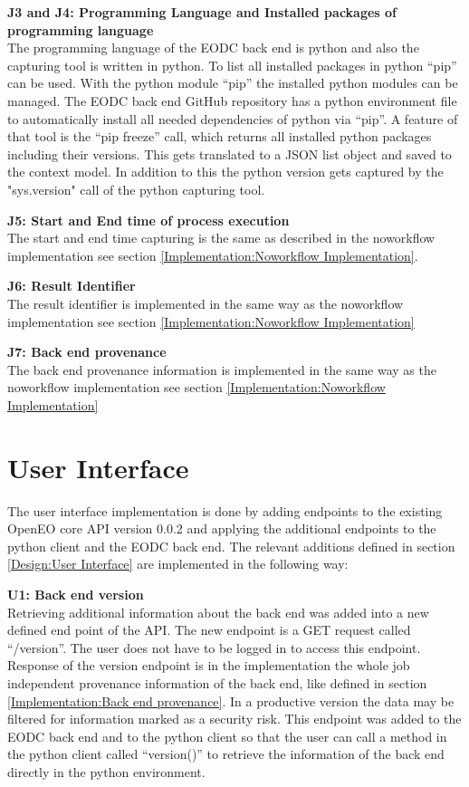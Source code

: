 \documentclass[draft,final]{vutinfth} %
\begin{document}
\textbf{J3 and J4: Programming Language and  Installed packages of programming language} \\
The programming language of the EODC back end is python and also the capturing tool is written in python. To list all installed packages in python “pip” can be used. With the python module “pip” the installed python modules can be managed. The EODC back end GitHub repository has a python environment file to automatically install all needed dependencies of python via “pip”. A feature of that tool is the “pip freeze” call, which returns all installed python packages including their versions. This gets translated to a JSON list object and saved to the context model. In addition to this the python version gets captured by the "sys.version" call of the python capturing tool.    

\textbf{J5: Start and End time of process execution} \\
The start and end time capturing is the same as described in the noworkflow implementation see section \ref{Implementation:Noworkflow Implementation}.

\textbf{J6: Result Identifier } \\
The result identifier is implemented in the same way as the noworkflow implementation see section \ref{Implementation:Noworkflow Implementation}

\textbf{J7: Back end provenance} \\
The back end provenance information is implemented in the same way as the noworkflow implementation see section \ref{Implementation:Noworkflow Implementation}

\section{User Interface}\label{Implementation:User Interface}
The user interface implementation is done by adding endpoints to the existing OpenEO core API version 0.0.2 and applying the additional endpoints to the python client and the EODC back end. The relevant additions defined in section \ref{Design:User Interface} are implemented in the following way:

\textbf{U1: Back end version} \\
Retrieving additional information about the back end was added into a new defined end point of the API. The new endpoint is a GET request called “/version”. The user does not have to be logged in to access this endpoint. Response of the version endpoint is in the implementation the whole job independent provenance information of the back end, like defined in section \ref{Implementation:Back end provenance}. In a productive version the data may be filtered for information marked as a security risk. This endpoint was added to the EODC back end and to the python client so that the user can call a method in the python client called “version()” to retrieve the information of the back end directly in the python environment. 
\end{document}
